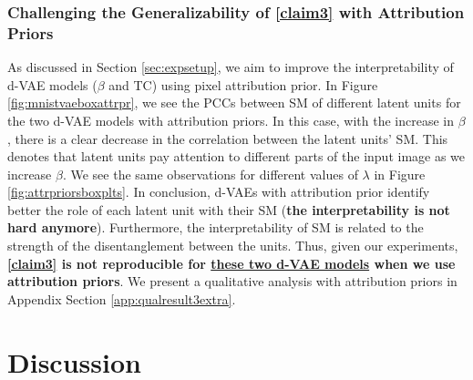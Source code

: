 \subsubsection{Challenging the Generalizability of \ref{claim3} with Attribution Priors}\label{sec:result3extra}
As discussed in Section \ref{sec:expsetup}, we aim to improve the interpretability of d-VAE models ($\beta$ and TC) using pixel attribution prior. 
In Figure \ref{fig:mnistvaeboxattrpr}, we see the PCCs between SM of different latent units for the two d-VAE models with attribution priors. In this case, with the increase in $\beta$, there is a clear decrease in the correlation between the latent units' SM. This denotes that latent units pay attention to different parts of the input image as we increase $\beta$. We see the same observations for different values of $\lambda$ in Figure \ref{fig:attrpriorsboxplts}.
In conclusion, d-VAEs with attribution prior identify better the role of each latent unit with their SM (\textbf{the interpretability is not hard anymore}). Furthermore, the interpretability of SM is related to the strength of the disentanglement between the units. 
Thus, given our experiments, \textbf{\ref{claim3} is not reproducible for \underline{these two d-VAE models} when we use attribution priors}. We present a qualitative analysis with attribution priors in Appendix Section \ref{app:qualresult3extra}.


\section{Discussion}
\label{sec:discussion}



